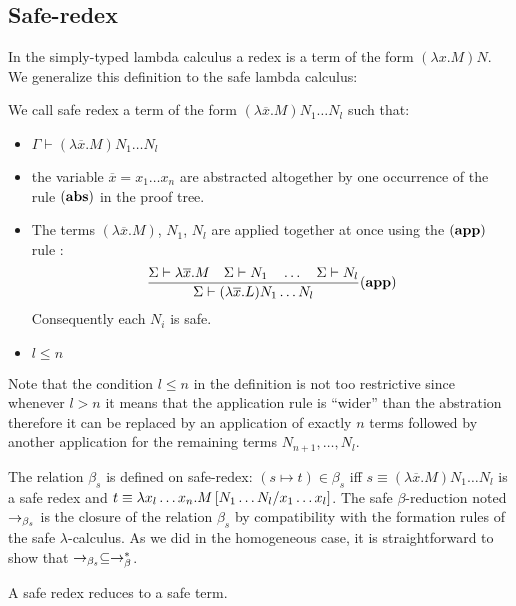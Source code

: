 \subsection{Safe-redex}
In the simply-typed lambda calculus a redex is a term of the form
$(\lambda x . M) N$. We generalize this definition to the safe
lambda calculus:
\begin{dfn}
We call safe redex a term of the form $(\lambda \overline{x} . M)
N_1 \ldots N_l$ such that:
\begin{itemize}
\item $ \Gamma \vdash (\lambda \overline{x} . M) N_1 \ldots N_l $
\item the variable $\overline{x}=x_1\ldots x_n$ are abstracted altogether by one occurrence of the rule $\mathbf{(abs)}$ in the proof tree.
\item The terms $(\lambda \overline{x} . M)$, $N_1$, $N_l$ are applied together at once using the $\mathbf{(app)}$ rule :
$$   \frac{\displaystyle 
            \Sigma \vdash \lambda \overline{x} . M
            \quad
            \Sigma \vdash N_1         \quad \ldots \quad \Sigma \vdash N_l
    }{
       \Sigma \vdash (\lambda \overline{x} . L) N_1 \ldots N_l
    } (\mathbf{app})
$$
Consequently each $N_i$ is safe.

\item $l\leq n$
\end{itemize}
\end{dfn}

Note that the condition $l\leq n$ in the definition is not too
restrictive since whenever $l>n$ it means that the application rule is ``wider'' than the abstration
therefore it can be replaced by an application of exactly $n$ terms
followed by another application for the remaining terms $N_{n+1},
\ldots, N_l$.


The relation $\beta_s$ is defined on safe-redex: $(s\mapsto t) \in \beta_s$ iff $s \equiv (\lambda \overline{x} . M) N_1 \ldots N_l$ is a safe redex and
$t \equiv \lambda x_l \ldots x_n . M \left[ N_1 \ldots N_l/x_1 \ldots x_l \right]$.
The safe $\beta$-reduction noted $\rightarrow_{\beta_s}$ is the closure of the relation $\beta_s$ by compatibility with the formation rules of the safe $\lambda$-calculus.
As we did in the homogeneous case, it is straightforward to show that $\rightarrow_{\beta_s} \subseteq \rightarrow_\beta^*$.


\begin{lem}
\label{lem:safereduction} A safe redex reduces to a safe term.
\end{lem}

